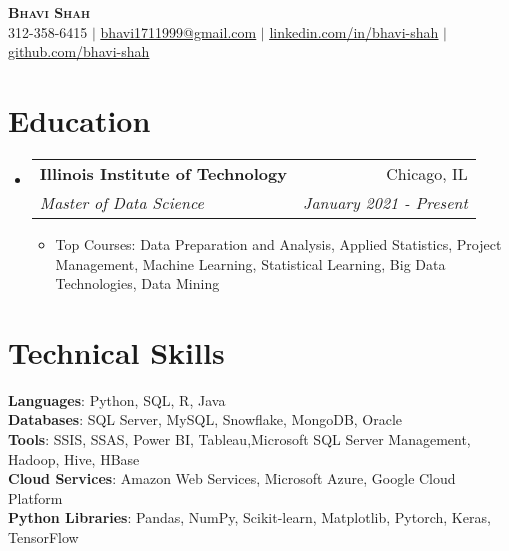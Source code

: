 \documentclass[letterpaper,11pt]{article}
\makeatletter
\newcommand{\resumeItem}[1]{
  \item\small{
    {#1 \vspace{-4pt}}
  }
}
\newcommand{\resumeSubheading}[4]{
  \vspace{-2pt}\item
    \begin{tabular*}{0.97\textwidth}[t]{l@{\extracolsep{\fill}}r}
      \textbf{#1} & #2 \\
      \textit{\small#3} & \textit{\small #4} \\
    \end{tabular*}\vspace{-7pt}
}
\newcommand{\resumeSubHeadingListStart}{\begin{itemize}[leftmargin=0.15in, label={}]}
\newcommand{\resumeSubHeadingListEnd}{\end{itemize}}
\newcommand{\resumeItemListStart}{\begin{itemize}}
\newcommand{\resumeItemListEnd}{\end{itemize}\vspace{-5pt}}
\makeatother
\begin{document}


\begin{center}
    \textbf{\Huge \scshape Bhavi Shah} \\ \vspace{1pt}
    \small 312-358-6415 $|$ \href{mailto:bhavi1711999@gmail.com }{\underline{bhavi1711999@gmail.com}} $|$ 
    \href{https://www.linkedin.com/in/bhavi--shah/}{\underline{linkedin.com/in/bhavi-shah}} $|$
    \href{https://github.com/bhavi-shah}{\underline{github.com/bhavi-shah}}
\end{center}


\section{Education}
  \resumeSubHeadingListStart
    \resumeSubheading
      {Illinois Institute of Technology }{Chicago, IL}
      {Master of Data Science \textbf{}}{January 2021 - Present}
          \resumeItemListStart
            \resumeItem{Top Courses: Data Preparation and Analysis, Applied Statistics, Project Management, Machine Learning, Statistical Learning, Big Data Technologies, Data Mining  }
        \resumeItemListEnd
  \resumeSubHeadingListEnd
  
\section{Technical Skills}
 \begin{itemize}[leftmargin=0.15in, label={}]
    \small{\item{
     \textbf{Languages}{: Python, SQL, R, Java} \\
     \textbf{Databases}{: SQL Server, MySQL, Snowflake, MongoDB, Oracle} \\
     \textbf{Tools}{: SSIS, SSAS, Power BI, Tableau,Microsoft SQL Server Management, Hadoop, Hive, HBase } \\
     \textbf{Cloud Services}{: Amazon Web Services, Microsoft Azure, Google Cloud Platform} \\
      \textbf{Python Libraries}{: Pandas, NumPy, Scikit-learn, Matplotlib, Pytorch, Keras, TensorFlow} \\
     
    }}
 \end{itemize}



\end{document}
